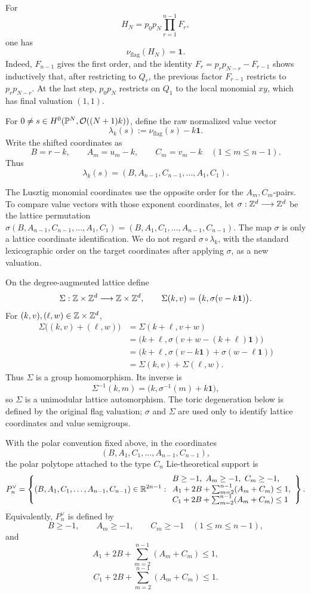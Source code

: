 For
\[
H_N=p_0p_N\prod_{r=1}^{n-1}F_r,
\]
one has
\[
\nu_{\mathrm{flag}}(H_N)=\mathbf 1.
\]
Indeed, \(F_{n-1}\) gives the first order, and the identity \(F_r=p_rp_{N-r}-F_{r-1}\) shows inductively that, after restricting to \(Q_r\), the previous factor \(F_{r-1}\) restricts to \(p_rp_{N-r}\). At the last step, \(p_0p_N\) restricts on \(Q_1\) to the local monomial \(xy\), which has final valuation \((1,1)\).

For \(0\ne s\in H^0(\mathbb{P}^N,\mathcal O((N+1)k))\), define the raw normalized value vector
\[
\lambda_k(s):=\nu_{\mathrm{flag}}(s)-k\mathbf 1.
\]
Write the shifted coordinates as
\[
B=r-k,
\qquad
A_m=u_m-k,
\qquad
C_m=v_m-k
\quad(1\le m\le n-1).
\]
Thus
\[
\lambda_k(s)
=
(B,A_{n-1},C_{n-1},\ldots,A_1,C_1).
\]

\begin{rmk}\label{rmk:lattice-identification}
The Lusztig monomial coordinates use the opposite order for the \(A_m,C_m\)-pairs. To compare value vectors with those exponent coordinates, let \(\sigma:\mathbb{Z}^d\longrightarrow\mathbb{Z}^d\) be the lattice permutation \(\sigma(B,A_{n-1},C_{n-1},\ldots,A_1,C_1)=(B,A_1,C_1,\ldots,A_{n-1},C_{n-1})\).
The map \(\sigma\) is only a lattice coordinate identification. We do not regard \(\sigma\circ\lambda_k\), with the standard lexicographic order on the target coordinates after applying \(\sigma\), as a new valuation.

On the degree-augmented lattice define
\[
\Sigma:\mathbb{Z}\times\mathbb{Z}^d\longrightarrow\mathbb{Z}\times\mathbb{Z}^d,
\qquad
\Sigma(k,v)=\bigl(k,\sigma(v-k\mathbf 1)\bigr).
\]
For \((k,v),(\ell,w)\in\mathbb{Z}\times\mathbb{Z}^d\),
\[
\begin{aligned}
\Sigma\bigl((k,v)+(\ell,w)\bigr)
&=
\Sigma(k+\ell,v+w)\\
&=
\bigl(k+\ell,\sigma(v+w-(k+\ell)\mathbf 1)\bigr)\\
&=
\bigl(k+\ell,\sigma(v-k\mathbf 1)+\sigma(w-\ell\mathbf 1)\bigr)\\
&=
\Sigma(k,v)+\Sigma(\ell,w).
\end{aligned}
\]
Thus \(\Sigma\) is a group homomorphism. Its inverse is
\[
\Sigma^{-1}(k,m)=\bigl(k,\sigma^{-1}(m)+k\mathbf 1\bigr),
\]
so \(\Sigma\) is a unimodular lattice automorphism. The toric degeneration below is defined by the original flag valuation; \(\sigma\) and \(\Sigma\) are used only to identify lattice coordinates and value semigroups.
\end{rmk}

With the polar convention fixed above, in the coordinates
\[
(B,A_1,C_1,\ldots,A_{n-1},C_{n-1}),
\]
the polar polytope attached to the type \(C_n\) Lie-theoretical support is
\[
P_n^\vee=\left\{(B,A_1,C_1,\ldots,A_{n-1},C_{n-1})\in\mathbb{R}^{2n-1}:
\begin{array}{l}
B\ge -1,\ A_m\ge -1,\ C_m\ge -1,\\
A_1+2B+\sum_{m=2}^{n-1}(A_m+C_m)\le1,\\
C_1+2B+\sum_{m=2}^{n-1}(A_m+C_m)\le1
\end{array}
\right\}.
\]
Equivalently, \(P_n^\vee\) is defined by
\[
B\ge -1,
\qquad
A_m\ge -1,
\qquad
C_m\ge -1
\quad(1\le m\le n-1),
\]
and
\[
A_1+2B+\sum_{m=2}^{n-1}(A_m+C_m)\le1,
\]
\[
C_1+2B+\sum_{m=2}^{n-1}(A_m+C_m)\le1.
\]

